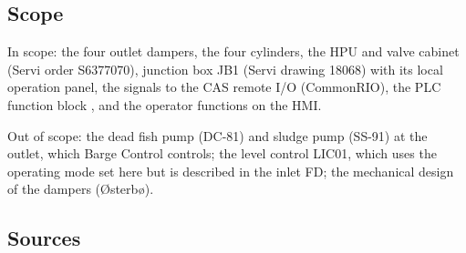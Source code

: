 \documentclass[11pt,a4paper]{article}
\begin{document}
\subsection{Scope}
In scope: the four outlet dampers, the four cylinders, the HPU and valve cabinet (Servi order
S6377070), junction box JB1 (Servi drawing 18068) with its local operation panel, the signals to the
CAS remote I/O (CommonRIO), the PLC function block , and the operator
functions on the HMI.

Out of scope: the dead fish pump (DC-81) and sludge pump (SS-91) at the outlet, which Barge Control
controls; the level control LIC01, which uses the operating mode set here but is described in the
inlet FD; the mechanical design of the dampers (Østerbø).

\subsection{Sources}
\end{document}
